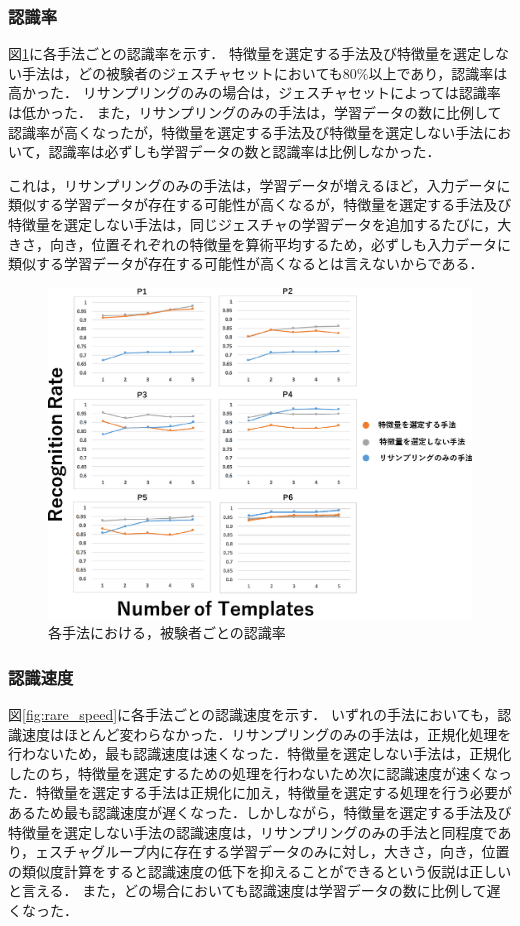 \subsubsection{認識率}
図\ref{fig:rare_rec}に各手法ごとの認識率を示す．
特徴量を選定する手法及び特徴量を選定しない手法は，どの被験者のジェスチャセットにおいても80\%以上であり，認識率は高かった．
リサンプリングのみの場合は，ジェスチャセットによっては認識率は低かった．
また，リサンプリングのみの手法は，学習データの数に比例して認識率が高くなったが，特徴量を選定する手法及び特徴量を選定しない手法において，認識率は必ずしも学習データの数と認識率は比例しなかった．

これは，リサンプリングのみの手法は，学習データが増えるほど，入力データに類似する学習データが存在する可能性が高くなるが，特徴量を選定する手法及び特徴量を選定しない手法は，同じジェスチャの学習データを追加するたびに，大きさ，向き，位置それぞれの特徴量を算術平均するため，必ずしも入力データに類似する学習データが存在する可能性が高くなるとは言えないからである．

\begin{figure}[!h]
\centering
\includegraphics[width=1.0\columnwidth]{img/pre_rec.eps}
\caption{各手法における，被験者ごとの認識率}
\label{fig:rare_rec}
\end{figure}

\subsubsection{認識速度}
図\ref{fig:rare_speed}に各手法ごとの認識速度を示す．
いずれの手法においても，認識速度はほとんど変わらなかった．リサンプリングのみの手法は，正規化処理を行わないため，最も認識速度は速くなった．特徴量を選定しない手法は，正規化したのち，特徴量を選定するための処理を行わないため次に認識速度が速くなった．特徴量を選定する手法は正規化に加え，特徴量を選定する処理を行う必要があるため最も認識速度が遅くなった．しかしながら，特徴量を選定する手法及び特徴量を選定しない手法の認識速度は，リサンプリングのみの手法と同程度であり，ェスチャグループ内に存在する学習データのみに対し，大きさ，向き，位置の類似度計算をすると認識速度の低下を抑えることができるという仮説は正しいと言える．
また，どの場合においても認識速度は学習データの数に比例して遅くなった．

